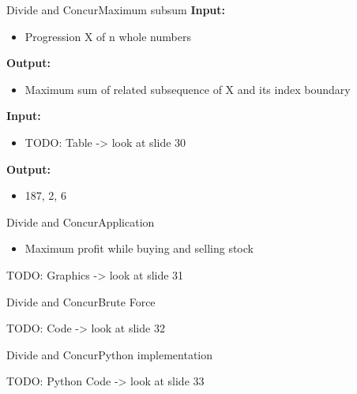 
\begin{frame}{Divide and Concur}{Maximum subsum}
	\textbf{Input:}
	\begin{itemize}
		\item
			Progression X of n whole numbers
	\end{itemize}
	\textbf{Output:}
	\begin{itemize}
		\item
			Maximum sum of related subsequence of X and its index boundary
	\end{itemize}
	\textbf{Input:}
	\begin{itemize}
		\item
			TODO: Table -> look at slide 30 \vspace{2em}
	\end{itemize}
	\textbf{Output:}
	\begin{itemize}
		\item
			187, 2, 6
	\end{itemize}
\end{frame}


\begin{frame}{Divide and Concur}{Application}
	\begin{itemize}
		\item
			Maximum profit while buying and selling stock
	\end{itemize}
	
	TODO: Graphics -> look at slide 31 \vspace{2em}
	
\end{frame}


\begin{frame}{Divide and Concur}{Brute Force}
	
	TODO: Code -> look at slide 32 \vspace{2em}
	
\end{frame}


\begin{frame}{Divide and Concur}{Python implementation}
	
	TODO: Python Code -> look at slide 33 \vspace{2em}
	
\end{frame}

